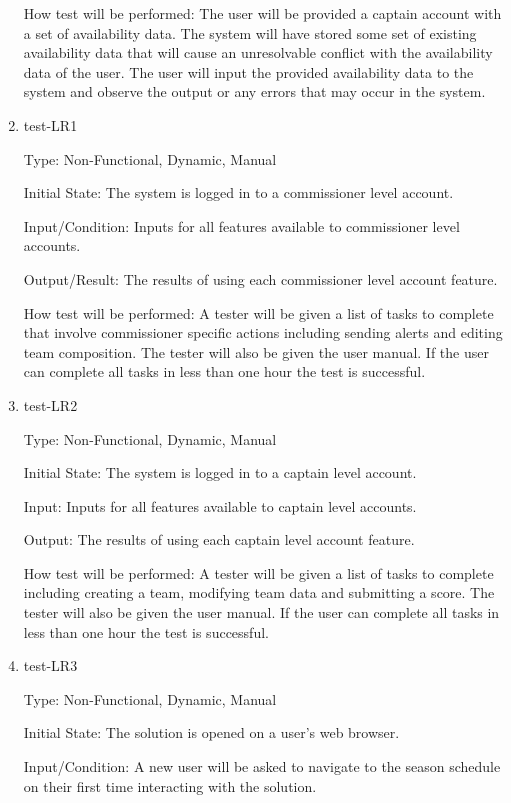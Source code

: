 \documentclass[12pt, titlepage]{article}
\begin{document}
\begin{enumerate}
  How test will be performed: The user will be provided a captain account with a set 
  of availability data. The system will have stored some set of existing availability 
  data that will cause an unresolvable conflict with the availability data of the user.
  The user will input the provided availability data to the system and observe the 
  output or any errors that may occur in the system.

  \item{test-LR1\\}

  Type: Non-Functional, Dynamic, Manual

  Initial State: The system is logged in to a commissioner level account.

  Input/Condition: Inputs for all features available to commissioner 
  level accounts.

  Output/Result: The results of using each commissioner level account 
  feature.

  How test will be performed: A tester will be given a list of tasks to
  complete that involve commissioner specific actions including sending 
  alerts and editing team composition. 
  The tester will also be given the user manual. If the user can
  complete all tasks in less than one hour the test is successful.

  \item{test-LR2\\}

  Type: Non-Functional, Dynamic, Manual

  Initial State: The system is logged in to a captain level account.

  Input: Inputs for all features available to captain level accounts.

  Output: The results of using each captain level account feature.

  How test will be performed: A tester will be given a list of tasks to
  complete including creating a team, modifying team data and submitting a
  score. The tester will also be given the user manual. If the user can
  complete all tasks in less than one hour the test is successful.

  \item{test-LR3\\}

  Type: Non-Functional, Dynamic, Manual

  Initial State: The solution is opened on a user's web browser.

  Input/Condition: A new user will be asked to navigate to the season schedule on their first
  time interacting with the solution.


\end{enumerate}
\end{document}
